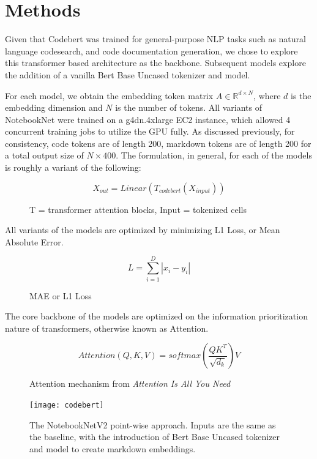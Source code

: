 \documentclass[conference]{IEEEtran}
\begin{document}
\section{Methods}

Given that Codebert was trained for general-purpose NLP tasks such as natural language codesearch, and code documentation generation, we chose to explore this transformer based architecture as the backbone. Subsequent models explore the addition of a vanilla Bert Base Uncased tokenizer and model.

For each model, we obtain the embedding token matrix $A \in \mathbb{R}^{d \times N}$, where $d$ is the embedding dimension and $N$ is the number of tokens. All variants of NotebookNet were trained on a g4dn.4xlarge EC2 instance, which allowed 4 concurrent training jobs to utilize the GPU fully. As discussed previously, for consistency, code tokens are of length 200, markdown tokens are of length 200 for a total output size of $N \times 400$. The formulation, in general, for each of the models is roughly a variant of the following:

\begin{figure}[h]
  \centering
  \[ X_{out} = Linear(T_{codebert}(X_{input})) \]
  \caption{T = transformer attention blocks, Input = tokenized cells}
\end{figure}

All variants of the models are optimized by minimizing L1 Loss, or Mean Absolute Error.

\begin{figure}[h]
  \centering
  \[ L=\sum_{i=1}^{D}|x_i-y_i| \]
  \caption{MAE or L1 Loss}
\end{figure}


The core backbone of the models are optimized on the information prioritization nature of transformers, otherwise known as Attention.

\begin{figure}[h]
  \centering
  \[ Attention(Q, K, V) = softmax(\frac{QK^T}{\sqrt{d_k}})V \]
  \caption{Attention mechanism from \it{Attention Is All You Need}}
\end{figure}


\begin{figure}
  \centering
  \texttt{[image: codebert]}
  \caption{The NotebookNetV2 point-wise approach. Inputs are the same as the baseline, with the introduction of Bert Base Uncased tokenizer and model to create markdown embeddings.}
\end{figure}
\end{document}
